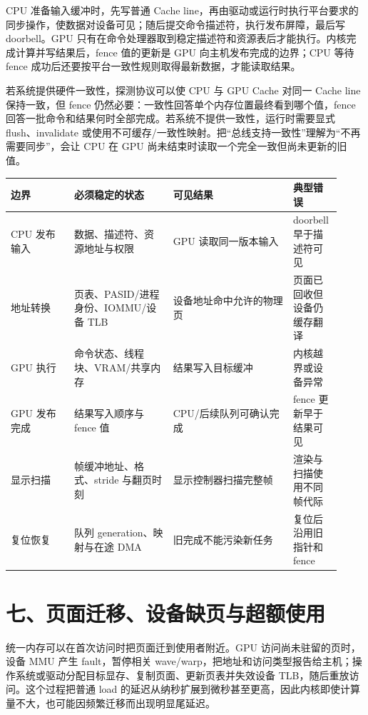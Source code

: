 CPU 准备输入缓冲时，先写普通 Cache line，再由驱动或运行时执行平台要求的同步操作，使数据对设备可见；随后提交命令描述符，执行发布屏障，最后写 doorbell。GPU 只有在命令处理器取到稳定描述符和资源表后才能执行。内核完成计算并写结果后，fence 值的更新是 GPU 向主机发布完成的边界；CPU 等待 fence 成功后还要按平台一致性规则取得最新数据，才能读取结果。

若系统提供硬件一致性，探测协议可以使 CPU 与 GPU Cache 对同一 Cache line 保持一致，但 fence 仍然必要：一致性回答单个内存位置最终看到哪个值，fence 回答一批命令和结果何时全部完成。若系统不提供一致性，运行时需要显式 flush、invalidate 或使用不可缓存/一致性映射。把“总线支持一致性”理解为“不再需要同步”，会让 CPU 在 GPU 尚未结束时读取一个完全一致但尚未更新的旧值。

\begin{longtable}{L{0.18\linewidth}L{0.28\linewidth}L{0.34\linewidth}L{0.12\linewidth}}
\toprule
边界 & 必须稳定的状态 & 可见结果 & 典型错误 \\
\midrule
CPU 发布输入 & 数据、描述符、资源地址与权限 & GPU 读取同一版本输入 & doorbell 早于描述符可见 \\\tablerowrule
地址转换 & 页表、PASID/进程身份、IOMMU/设备 TLB & 设备地址命中允许的物理页 & 页面已回收但设备仍缓存翻译 \\\tablerowrule
GPU 执行 & 命令状态、线程块、VRAM/共享内存 & 结果写入目标缓冲 & 内核越界或设备异常 \\\tablerowrule
GPU 发布完成 & 结果写入顺序与 fence 值 & CPU/后续队列可确认完成 & fence 更新早于结果可见 \\\tablerowrule
显示扫描 & 帧缓冲地址、格式、stride 与翻页时刻 & 显示控制器扫描完整帧 & 渲染与扫描使用不同帧代际 \\\tablerowrule
复位恢复 & 队列 generation、映射与在途 DMA & 旧完成不能污染新任务 & 复位后沿用旧指针和 fence \\
\bottomrule
\end{longtable}

\section{七、页面迁移、设备缺页与超额使用}

统一内存可以在首次访问时把页面迁到使用者附近。GPU 访问尚未驻留的页时，设备 MMU 产生 fault，暂停相关 wave/warp，把地址和访问类型报告给主机；操作系统或驱动分配目标显存、复制页面、更新页表并失效设备 TLB，随后重放访问。这个过程把普通 load 的延迟从纳秒扩展到微秒甚至更高，因此内核即使计算量不大，也可能因频繁迁移而出现明显尾延迟。

